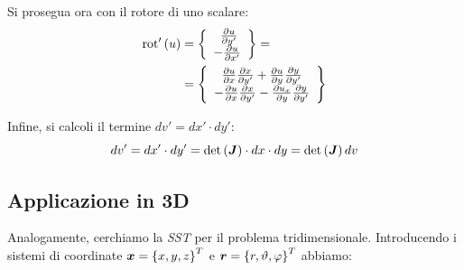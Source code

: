 Si prosegua ora con il rotore di uno scalare:
\begin{align}
\label{eq:4boundaryrot2d}
\text{rot}'\left(u\right) &= \left\{
\begin{array}{c}
\;\frac{\partial u}{\partial y'}\\
-\frac{\partial u}{\partial x'}
\end{array}
\right\} = \nonumber \\
&=\left\{
\begin{array}{c}
\frac{\partial u}{\partial x} \frac{\partial x}{\partial y'}+\frac{\partial u}{\partial y} \frac{\partial y}{\partial y'}\\
-\frac{\partial u}{\partial x} \frac{\partial x}{\partial y'}-\frac{\partial u_x}{\partial y} \frac{\partial y}{\partial y'}
\end{array}\right\}
\end{align}

Infine, si calcoli il termine $dv' = dx' \cdot dy'$:
\begin{equation}
\label{2boundaryjacobian2d}
dv' = dx' \cdot dy'= \text{det}\left(\boldsymbol{J}\right)\cdot dx \cdot dy=  \text{det}\left(\boldsymbol{J}\right) dv
\end{equation}

\subsection{Applicazione in 3D}
Analogamente, cerchiamo la \textit{SST} per il problema tridimensionale.
Introducendo i sistemi di coordinate $\boldsymbol{x}=\left\{x, y, z\right\}^T$ e $\boldsymbol{r}=\left\{r, \vartheta, \varphi\right\}^T$ abbiamo:


